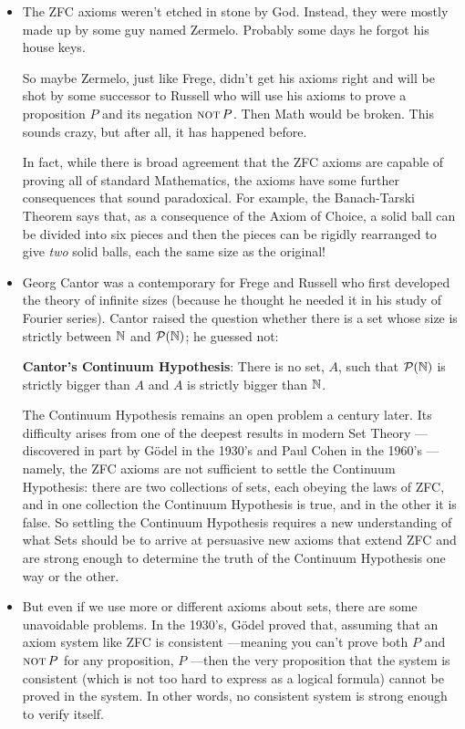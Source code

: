 %
\begin{itemize}

\item The ZFC axioms weren't etched in stone by God.  Instead, they were
  mostly made up by some guy named Zermelo.  Probably some days he forgot
  his house keys.

  So maybe Zermelo, just like Frege, didn't get his axioms right and will
  be shot by some successor to Russell who will use his axioms to prove a
  proposition $P$ and its negation $\mathop{\mathrm{\textsc{not}}} P$.  Then Math would be broken.
  This sounds crazy, but after all, it has happened before.

  In fact, while there is broad agreement that the ZFC axioms are capable
  of proving all of standard Mathematics, the axioms have some further
  consequences that sound paradoxical.  For example, the Banach-Tarski
  Theorem says that, as a consequence of the Axiom of Choice, a solid ball
  can be divided into six pieces and then the pieces can be rigidly
  rearranged to give \textit{two} solid balls, each the same size as the
  original!

\item Georg Cantor was a contemporary for Frege and Russell who first
  developed the theory of infinite sizes (because he thought he needed it
  in his study of Fourier series).  Cantor raised the question whether
  there is a set whose size is strictly between $\mathbb{N}$ and
  $\mathcal{P}(\mathbb{N})$; he guessed not:

\textbf{Cantor's Continuum Hypothesis}: There is no set, $A$, such that
$\mathcal{P}(\mathbb{N})$ is strictly bigger than $A$ and $A$ is strictly bigger
than $\mathbb{N}$.

The Continuum Hypothesis remains an open problem a century later.  Its
difficulty arises from one of the deepest results in modern Set Theory
---discovered in part by G\"odel in the 1930's and Paul Cohen in the
1960's ---namely, the ZFC axioms are not sufficient to settle the
Continuum Hypothesis: there are two collections of sets, each obeying the
laws of ZFC, and in one collection the Continuum Hypothesis is true, and
in the other it is false.  So settling the Continuum Hypothesis requires a
new understanding of what Sets should be to arrive at persuasive new
axioms that extend ZFC and are strong enough to determine the truth of the
Continuum Hypothesis one way or the other.

\item But even if we use more or different axioms about sets, there are
  some unavoidable problems.  In the 1930's, G\"{o}del proved that,
  assuming that an axiom system like ZFC is consistent ---meaning you
  can't prove both $P$ and $\mathop{\mathrm{\textsc{not}}} P$ for any proposition, $P$ ---then the
  very proposition that the system is consistent (which is not too hard to
  express as a logical formula) cannot be proved in the system.  In other
  words, no consistent system is strong enough to verify itself.
  
\end{itemize}

